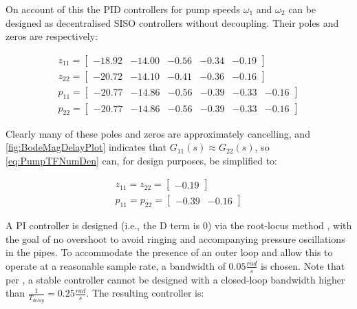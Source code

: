 \newpage

On account of this the PID controllers for pump speeds $\omega_1$ and $\omega_2$ can be designed as decentralised SISO controllers without decoupling. Their poles and zeros are respectively:

\begin{equation}\label{eq:PumpTFNumDen}
	\begin{gathered}
		z_{11} = \begin{bmatrix}-18.92 & -14.00 & -0.56 & -0.34 & -0.19	\end{bmatrix} \\
		z_{22} = \begin{bmatrix}-20.72 & -14.10 & -0.41 & -0.36 & -0.16	\end{bmatrix} \\
		p_{11} = \begin{bmatrix}-20.77 & -14.86 & -0.56 & -0.39 & -0.33 & -0.16\end{bmatrix} \\
		p_{22} = \begin{bmatrix}-20.77 & -14.86 & -0.56 & -0.39 & -0.33 & -0.16\end{bmatrix}
	\end{gathered}
\end{equation}

Clearly many of these poles and zeros are approximately cancelling, and \cref{fig:BodeMagDelayPlot} indicates that $G_{11}(s) \approx G_{22}(s)$, so \cref{eq:PumpTFNumDen} can, for design purposes, be simplified to:

\begin{equation}\label{eq:PumpTFSimple}
	\begin{gathered}
		z_{11} = z_{22} = \begin{bmatrix}-0.19\end{bmatrix} \\
		p_{11} = p_{22} = \begin{bmatrix}-0.39 & -0.16 \end{bmatrix}
	\end{gathered}
\end{equation}

A PI controller is designed (i.e., the D term is $0$) via the root-locus method \cite{Franklin}, with the goal of no overshoot to avoid ringing and accompanying pressure oscillations in the pipes. To accommodate the presence of an outer loop and allow this to operate at a reasonable sample rate, a bandwidth of $0.05 \frac{\si{rad}}{\si{s}}$ is chosen. Note that per \cite{Skogestad2005}, a stable controller cannot be designed with a closed-loop bandwidth higher than $\frac{1}{T_{delay}} = 0.25 \frac{\si{rad}}{\si{s}}$. The resulting controller is:

